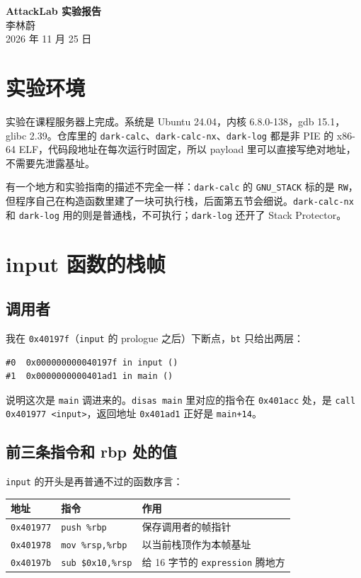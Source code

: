 \documentclass[UTF8,11pt,fontset=fandol]{ctexart}
\newcommand{\code}[1]{\texttt{#1}}
\begin{document}
\pagestyle{plain}
\setlength{\emergencystretch}{2em}

\begin{center}
{\Large\bfseries AttackLab 实验报告}\\[6pt]
李林蔚\\[2pt]
2026 年 11 月 25 日
\end{center}

\section{实验环境}

实验在课程服务器上完成。系统是 Ubuntu 24.04，内核 6.8.0-138，gdb 15.1，glibc 2.39。仓库里的 \code{dark-calc}、\code{dark-calc-nx}、\code{dark-log} 都是非 PIE 的 x86-64 ELF，代码段地址在每次运行时固定，所以 payload 里可以直接写绝对地址，不需要先泄露基址。

有一个地方和实验指南的描述不完全一样：\code{dark-calc} 的 \code{GNU\_STACK} 标的是 \code{RW}，但程序自己在构造函数里建了一块可执行栈，后面第五节会细说。\code{dark-calc-nx} 和 \code{dark-log} 用的则是普通栈，不可执行；\code{dark-log} 还开了 Stack Protector。

\section{input 函数的栈帧}

\subsection{调用者}

我在 \code{0x40197f}（\code{input} 的 prologue 之后）下断点，\code{bt} 只给出两层：

\begin{lstlisting}
#0  0x000000000040197f in input ()
#1  0x0000000000401ad1 in main ()
\end{lstlisting}

说明这次是 \code{main} 调进来的。\code{disas main} 里对应的指令在 \code{0x401acc} 处，是 \code{call 0x401977 <input>}，返回地址 \code{0x401ad1} 正好是 \code{main+14}。

\subsection{前三条指令和 rbp 处的值}

\code{input} 的开头是再普通不过的函数序言：

\begin{center}
\begin{tabular}{@{}lll@{}}
\toprule
地址 & 指令 & 作用\\
\midrule
\code{0x401977} & \code{push \%rbp} & 保存调用者的帧指针\\
\code{0x401978} & \code{mov \%rsp,\%rbp} & 以当前栈顶作为本帧基址\\
\code{0x40197b} & \code{sub \$0x10,\%rsp} & 给 16 字节的 \code{expression} 腾地方\\
\bottomrule
\end{tabular}
\end{center}
\end{document}
